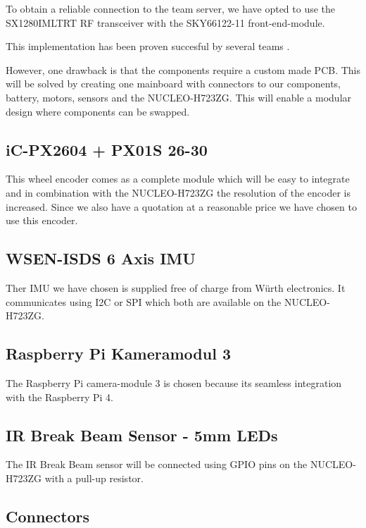 \documentclass[a4paper,4pt]{article}
\begin{document}
  To obtain a reliable connection to the team server, we have opted to
  use the SX1280IMLTRT RF transceiver with the SKY66122-11
  front-end-module.

  This implementation has been proven succesful by several teams \cite{ryllExtendedTeamDescription}\cite{barretoRoboIMEIgnitingInnovation}.

  However, one drawback is that the components require a custom made
  PCB. This will be solved by creating one mainboard with connectors to
  our components, battery, motors, sensors and the NUCLEO-H723ZG. This
  will enable a modular design where components can be swapped.

  \subsection{iC-PX2604 + PX01S 26-30}

  This wheel encoder comes as a complete module which will be easy to
  integrate and in combination with the NUCLEO-H723ZG the resolution of
  the encoder is increased. Since we also have a quotation at a
  reasonable price we have chosen to use this encoder.

  \subsection{WSEN-ISDS 6 Axis IMU}

  Ther IMU we have chosen is supplied free of charge from Würth
  electronics. It communicates using I2C or SPI which both are available
  on the NUCLEO-H723ZG.

  \subsection{Raspberry Pi Kameramodul 3}

  The Raspberry Pi camera-module 3 is chosen because its seamless
  integration with the Raspberry Pi 4.

  \subsection{IR Break Beam Sensor - 5mm LEDs}

  The IR Break Beam sensor will be connected using GPIO pins on the
  NUCLEO-H723ZG with a pull-up resistor.

  \subsection{Connectors}
\end{document}
